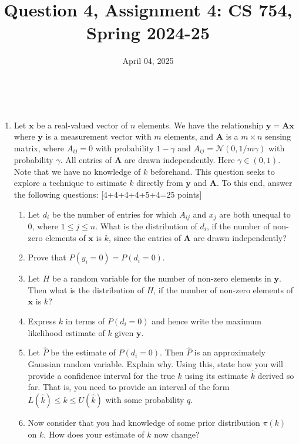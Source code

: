 \documentclass{article}
\title{Question 4, Assignment 4: CS 754, Spring 2024-25}
\author{
\IEEEauthorblockN{
    \begin{tabular}{cccc}
        \begin{minipage}[t]{0.23\textwidth}
            \centering
            Amitesh Shekhar\\
            IIT Bombay\\
            22b0014@iitb.ac.in
        \end{minipage} & 
        \begin{minipage}[t]{0.23\textwidth}
            \centering
            Anupam Rawat\\
            IIT Bombay\\
            22b3982@iitb.ac.in
        \end{minipage} & 
        \begin{minipage}[t]{0.23\textwidth}
            \centering
            Toshan Achintya Golla\\
            IIT Bombay\\
            22b2234@iitb.ac.in
        \end{minipage} \\
        \\ 
    \end{tabular}
}
}
\date{April 04, 2025}
\begin{document}
\maketitle

\\


\begin{enumerate}
\item Let $\boldsymbol{x}$ be a real-valued vector of $n$ elements. We have the relationship $\boldsymbol{y} = \boldsymbol{Ax}$ where $\boldsymbol{y}$ is a measurement vector with $m$ elements, and $\boldsymbol{A}$ is a $m \times n$ sensing matrix, where $A_{ij} = 0$ with probability $1-\gamma$ and $A_{ij} = \mathcal{N}(0,1/{m\gamma})$ with probability $\gamma$. All entries of $\boldsymbol{A}$ are drawn independently. Here $\gamma \in (0,1)$. Note that we have no knowledge of $k$ beforehand. This question seeks to explore a technique to estimate $k$ directly from $\boldsymbol{y}$ and $\boldsymbol{A}$. To this end, answer the following questions: \textsf{[4+4+4+4+5+4=25 points]}
\begin{enumerate}
\item Let $d_i$ be the number of entries for which $A_{ij}$ and $x_j$ are both unequal to 0, where $1 \leq j \leq n$. What is the distribution of $d_i$, if the number of non-zero elements of $\boldsymbol{x}$ is $k$, since the entries of $\boldsymbol{A}$ are drawn independently?
\item Prove that $P(y_i = 0) = P(d_i = 0)$. 
\item Let $H$ be a random variable for the number of non-zero elements in $\boldsymbol{y}$. Then what is the distribution of $H$, if the number of non-zero elements of $\boldsymbol{x}$ is $k$?
\item Express $k$ in terms of $P(d_i = 0)$ and hence write the maximum likelihood estimate of $k$ given $\boldsymbol{y}$. 
\item Let $\hat{P}$ be the estimate of $P(d_i = 0)$. Then $\hat{P}$ is an approximately Gaussian random variable. Explain why. Using this, state how you will provide a confidence interval for the true $k$ using its estimate $\hat{k}$ derived so far. That is, you need to provide an interval of the form $L(\hat{k}) \leq k \leq U(\hat{k})$ with some probability $q$.
\item Now consider that you had knowledge of some prior distribution $\pi(k)$ on $k$. How does your estimate of $k$ now change?  
\end{enumerate}
\end{enumerate}
\end{document}

